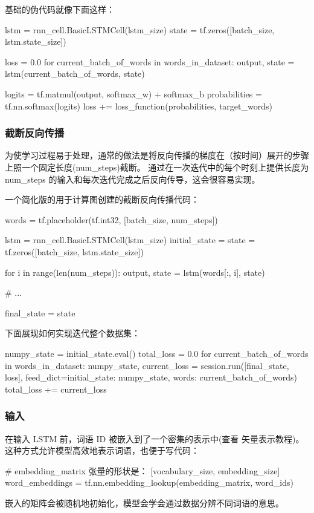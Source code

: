 基础的伪代码就像下面这样：
\begin{python}
lstm = rnn_cell.BasicLSTMCell(lstm_size)
state = tf.zeros([batch_size, lstm.state_size])

loss = 0.0
for current_batch_of_words in words_in_dataset:
    output, state = lstm(current_batch_of_words, state)

    logits = tf.matmul(output, softmax_w) + softmax_b
    probabilities = tf.nn.softmax(logits)
    loss += loss_function(probabilities, target_words)
\end{python}
\subsubsection{截断反向传播}
为使学习过程易于处理，通常的做法是将反向传播的梯度在（按时间）展开的步骤上照一个固定长度(num\_steps)截断。 通过在一次迭代中的每个时刻上提供长度为 num\_steps 的输入和每次迭代完成之后反向传导，这会很容易实现。

一个简化版的用于计算图创建的截断反向传播代码：
\begin{python}
words = tf.placeholder(tf.int32, [batch_size, num_steps])

lstm = rnn_cell.BasicLSTMCell(lstm_size)
initial_state = state = tf.zeros([batch_size, lstm.state_size])

for i in range(len(num_steps)):
    output, state = lstm(words[:, i], state)

    # ...

final_state = state
\end{python}
下面展现如何实现迭代整个数据集：
\begin{python}
numpy_state = initial_state.eval()
total_loss = 0.0
for current_batch_of_words in words_in_dataset:
    numpy_state, current_loss = session.run([final_state, loss],
        feed_dict={initial_state: numpy_state, words: current_batch_of_words})
    total_loss += current_loss
\end{python}
\subsubsection{输入}
在输入 LSTM 前，词语 ID 被嵌入到了一个密集的表示中(查看 矢量表示教程)。这种方式允许模型高效地表示词语，也便于写代码：
\begin{python}
# embedding_matrix 张量的形状是： [vocabulary_size, embedding_size]
word_embeddings = tf.nn.embedding_lookup(embedding_matrix, word_ids)
\end{python}
嵌入的矩阵会被随机地初始化，模型会学会通过数据分辨不同词语的意思。
